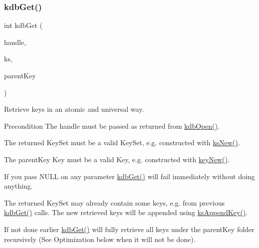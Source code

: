 \subsubsection{\texorpdfstring{kdbGet()}{kdbGet()}}
{\footnotesize\ttfamily int kdb\+Get (\begin{DoxyParamCaption}\item[{K\+DB $\ast$}]{handle,  }\item[{Key\+Set $\ast$}]{ks,  }\item[{Key $\ast$}]{parent\+Key }\end{DoxyParamCaption})}



Retrieve keys in an atomic and universal way. 

\begin{DoxyPrecond}{Precondition}
The {\ttfamily handle} must be passed as returned from \mbox{\hyperlink{group__kdb_ga6808defe5870f328dd17910aacbdc6ca}{kdb\+Open()}}.

The {\ttfamily returned} Key\+Set must be a valid Key\+Set, e.\+g. constructed with \mbox{\hyperlink{group__keyset_ga671e1aaee3ae9dc13b4834a4ddbd2c3c}{ks\+New()}}.

The {\ttfamily parent\+Key} Key must be a valid Key, e.\+g. constructed with \mbox{\hyperlink{group__key_gad23c65b44bf48d773759e1f9a4d43b89}{key\+New()}}.
\end{DoxyPrecond}
If you pass N\+U\+LL on any parameter \mbox{\hyperlink{group__kdb_ga28e385fd9cb7ccfe0b2f1ed2f62453a1}{kdb\+Get()}} will fail immediately without doing anything.

The {\ttfamily returned} Key\+Set may already contain some keys, e.\+g. from previous \mbox{\hyperlink{group__kdb_ga28e385fd9cb7ccfe0b2f1ed2f62453a1}{kdb\+Get()}} calls. The new retrieved keys will be appended using \mbox{\hyperlink{group__keyset_gaa5a1d467a4d71041edce68ea7748ce45}{ks\+Append\+Key()}}.

If not done earlier \mbox{\hyperlink{group__kdb_ga28e385fd9cb7ccfe0b2f1ed2f62453a1}{kdb\+Get()}} will fully retrieve all keys under the {\ttfamily parent\+Key} folder recursively (See Optimization below when it will not be done).

